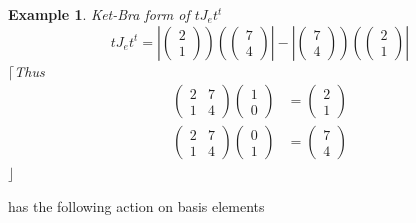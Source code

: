 \documentclass[aps,preprint]{revtex4}
\newtheorem{example}[theorem]{Example}
\begin{document}
\begin{example}
Ket-Bra form of $tJ_{e}t^{t}$ 
\begin{equation}
tJ_{e}t^{t}=\left\vert \left( 
\begin{array}{c}
2 \\ 
1%
\end{array}%
\right) \right) \left( \left( 
\begin{array}{c}
7 \\ 
4%
\end{array}%
\right) \right\vert -\left\vert \left( 
\begin{array}{c}
7 \\ 
4%
\end{array}%
\right) \right) \left( \left( 
\begin{array}{c}
2 \\ 
1%
\end{array}%
\right) \right\vert
\end{equation}%
$\lceil $Thus 
\begin{align}
\left( 
\begin{array}{cc}
2 & 7 \\ 
1 & 4%
\end{array}%
\right) \left( 
\begin{array}{c}
1 \\ 
0%
\end{array}%
\right) & =\left( 
\begin{array}{c}
2 \\ 
1%
\end{array}%
\right) \\
\left( 
\begin{array}{cc}
2 & 7 \\ 
1 & 4%
\end{array}%
\right) \left( 
\begin{array}{c}
0 \\ 
1%
\end{array}%
\right) & =\left( 
\begin{array}{c}
7 \\ 
4%
\end{array}%
\right)
\end{align}%
$\rfloor $
\end{example}

has the following action on basis elements
\end{document}
